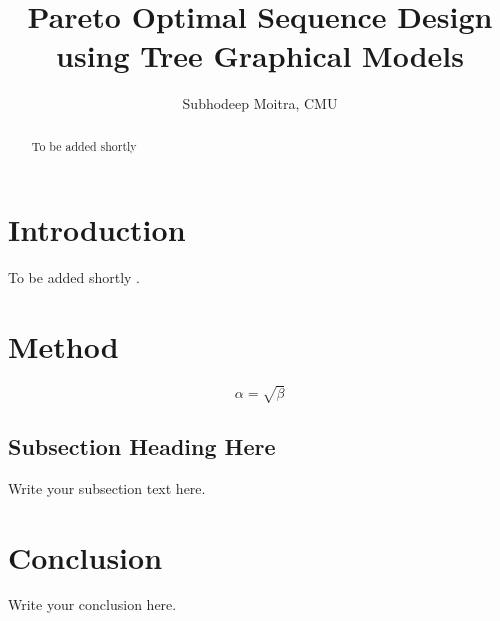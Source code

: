 \documentclass{article}
\begin{document}
\title{Pareto Optimal Sequence Design using Tree Graphical Models}
\author{Subhodeep Moitra, CMU}

\maketitle

\begin{abstract}
To be added shortly
\end{abstract}

\section{Introduction}
To be added shortly \cite{Ambroggio2006}.

\section{Method}

\begin{equation}
    \label{simple_equation}
    \alpha = \sqrt{ \beta }
\end{equation}

\subsection{Subsection Heading Here}
Write your subsection text here.


\section{Conclusion}
Write your conclusion here.



\end{document}
